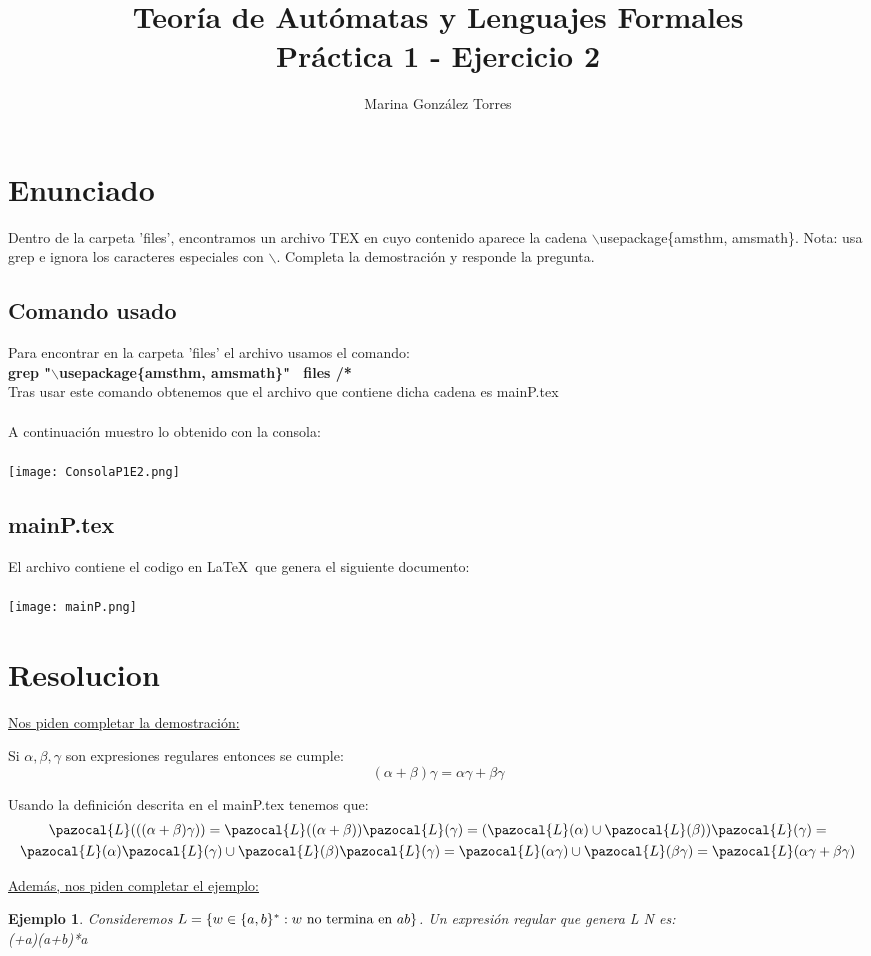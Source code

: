 \documentclass{article}
\title{Teoría de Autómatas y Lenguajes Formales\\[.4\baselineskip]Práctica 1 - Ejercicio 2}
\author{Marina González Torres}
\date{}
\begin{document}
\maketitle
\setlength{\parindent}{0pt}

\section*{Enunciado}
Dentro de la carpeta 'files', encontramos un archivo TEX en cuyo contenido aparece la cadena $\backslash$usepackage\{amsthm, amsmath\}. Nota: usa grep e ignora los caracteres especiales con $\backslash$. Completa la demostración y responde la pregunta.

\subsection*{Comando usado}
Para encontrar en la carpeta 'files' el archivo usamos el comando:
\\ \textbf{grep "$\backslash$usepackage\{amsthm, amsmath\}" \ files /*}
\\ Tras usar este comando obtenemos que el archivo que contiene dicha cadena es mainP.tex
\\ 
\\A continuación muestro lo obtenido con la consola:
\\
\\ \texttt{[image: ConsolaP1E2.png]}

\clearpage
\subsection*{mainP.tex}
El archivo contiene el codigo en \LaTeX \ que genera el siguiente documento:
\\
\\ \texttt{[image: mainP.png]}

\clearpage
\section*{Resolucion}
\underline{Nos piden completar la demostración:}
\\
\newcommand{\Lb}{\pazocal{L}}

Si $\alpha,\beta,\gamma$ son expresiones regulares entonces se cumple:
\begin{equation}
    (\alpha+\beta)\gamma=\alpha\gamma+\beta\gamma
\end{equation}


\begin{proof*}
Usando la definición descrita en el mainP.tex tenemos que:
    \begin{multline*}
        \Lb(((\alpha+\beta)\gamma))= \Lb((\alpha+\beta))\Lb(\gamma)= (\Lb(\alpha)\cup \Lb(\beta))\Lb(\gamma)= \\ \Lb(\alpha)\Lb(\gamma)\cup \Lb(\beta)\Lb(\gamma)= \Lb(\alpha\gamma) \cup \Lb(\beta\gamma) = \Lb(\alpha\gamma + \beta\gamma)
    \end{multline*}
\end{proof*}

\underline{Además, nos piden completar el ejemplo:}

\newtheorem{example}{Ejemplo}
\begin{example}
Consideremos $L=\{w\in \{a,b\}^* : w \textnormal{ no termina en } ab\}$. Un expresión regular que genera L N es: \\
(\epsilon+a)(a+b)*a

\end{example}
\end{document}
